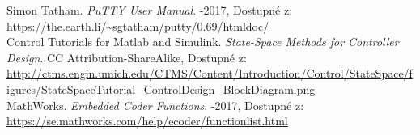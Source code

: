\documentclass[thesis=M,czech,hidelinks]{FITthesis}[2012/06/26]
\begin{document}
\begin{thebibliography}{9}
       	Simon Tatham. \textit{PuTTY User Manual}. -2017, Dostupné z: \\    \url{https://the.earth.li/~sgtatham/putty/0.69/htmldoc/} \\       	
              	
       	Control Tutorials for Matlab and Simulink. \textit{State-Space Methods for Controller Design}.  CC Attribution-ShareAlike, Dostupné z: \\    \url{http://ctms.engin.umich.edu/CTMS/Content/Introduction/Control/StateSpace/figures/StateSpaceTutorial_ControlDesign_BlockDiagram.png} \\
   
        	MathWorks. \textit{Embedded Coder Functions}. -2017, Dostupné z: \\    \url{https://se.mathworks.com/help/ecoder/functionlist.html} \\   	
     	
\end{thebibliography}

\appendix

\end{document}
